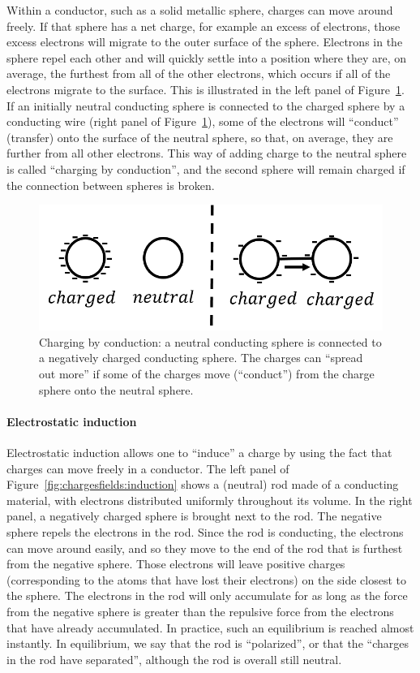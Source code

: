 Within a conductor, such as a solid metallic sphere, charges can move around freely. If that sphere has a net charge, for example an excess of electrons, those excess electrons will migrate to the outer surface of the sphere. Electrons in the sphere repel each other and will quickly settle into a position where they are, on average, the furthest from all of the other electrons, which occurs if all of the electrons migrate to the surface. This is illustrated in the left panel of Figure~\ref{fig:chargesfields:conductioncharge}. If an initially neutral conducting sphere is connected to the charged sphere by a conducting wire (right panel of Figure~\ref{fig:chargesfields:conductioncharge}), some of the electrons will ``conduct'' (transfer) onto the surface of the neutral sphere, so that, on average, they are further from all other electrons. This way of adding charge to the neutral sphere is called ``charging by conduction'', and the second sphere will remain charged if the connection between spheres is broken.

\begin{figure}[!htbp]
\centering
\includegraphics[width=0.7\linewidth]{files/conductioncharge-13c1ad8aca42859d6e0e2273eeb697c0.png}
\caption[]{Charging by conduction: a neutral conducting sphere is connected to a negatively charged conducting sphere. The charges can ``spread out more'' if some of the charges move (``conduct'') from the charge sphere onto the neutral sphere.}
\label{fig:chargesfields:conductioncharge}
\end{figure}

\paragraph{Electrostatic induction}

Electrostatic induction allows one to ``induce'' a charge by using the fact that charges can move freely in a conductor. The left panel of Figure~\ref{fig:chargesfields:induction} shows a (neutral) rod made of a conducting material, with electrons distributed uniformly throughout its volume. In the right panel, a negatively charged sphere is brought next to the rod. The negative sphere repels the electrons in the rod. Since the rod is conducting, the electrons can move around easily, and so they move to the end of the rod that is furthest from the negative sphere. Those electrons will leave positive charges (corresponding to the atoms that have lost their electrons) on the side closest to the sphere. The electrons in the rod will only accumulate for as long as the force from the negative sphere is greater than the repulsive force from the electrons that have already accumulated. In practice, such an equilibrium is reached almost instantly. In equilibrium, we say that the rod is ``polarized'', or that the ``charges in the rod have separated'', although the rod is overall still neutral.

